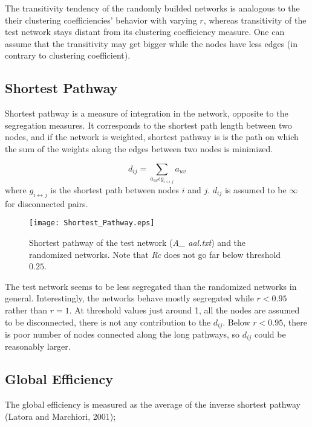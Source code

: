 \documentclass[12pt]{article}
\begin{document}
The transitivity tendency of the randomly builded networks is analogous to the their clustering coefficiencies' behavior with varying $r$, whereas transitivity of the test network stays distant from its clustering coefficiency measure. One can assume that the transitivity may get bigger while the nodes have less edges (in contrary to clustering coefficient).

\newpage

\subsection{Shortest Pathway}
Shortest pathway is a measure of integration in the network, opposite to the segregation measures. It corresponds to the shortest path length between two nodes, and if the network is weighted, shortest pathway is is the path on which the sum of the weights along the edges between two nodes is minimized.  

\begin{equation}
d_{ij} = \sum\limits_{a_{uv} \epsilon g_{i\leftrightarrow j} } a_{uv}
\end{equation}
where $g_{i\leftrightarrow j}$ is the shortest path between nodes $i$ and $j$. $d_{ij}$ is assumed to be $\infty$ for disconnected pairs.


\begin{figure}[h!]
	
	\centering
	\texttt{[image: Shortest\_Pathway.eps]}
	\caption{Shortest pathway of the test network (\textit{A\_ aal.txt}) and the randomized networks. Note that \textit{Rc} does not go far below threshold $0.25$.}
\end{figure}

The test network seems to be less segregated than the randomized networks in general. Interestingly, the networks behave mostly segregated while $r<0.95$ rather than $r=1$. At threshold values just around 1, all the nodes are assumed to be disconnected, there is not any contribution to the $d_{ij}$. Below $r<0.95$, there is poor number of nodes connected along the long pathways, so $d_{ij}$ could be reasonably larger. 

\newpage

\subsection{Global Efficiency}
The global efficiency is measured as the average of the inverse shortest pathway (Latora and Marchiori, 2001);
\end{document}
